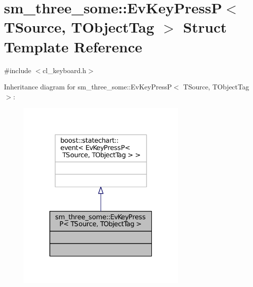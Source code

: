 \hypertarget{structsm__three__some_1_1EvKeyPressP}{}\section{sm\+\_\+three\+\_\+some\+:\+:Ev\+Key\+PressP$<$ T\+Source, T\+Object\+Tag $>$ Struct Template Reference}
\label{structsm__three__some_1_1EvKeyPressP}


{\ttfamily \#include $<$cl\+\_\+keyboard.\+h$>$}



Inheritance diagram for sm\+\_\+three\+\_\+some\+:\+:Ev\+Key\+PressP$<$ T\+Source, T\+Object\+Tag $>$\+:
\nopagebreak
\begin{figure}[H]
\begin{center}
\leavevmode
\includegraphics[width=235pt]{structsm__three__some_1_1EvKeyPressP__inherit__graph}
\end{center}
\end{figure}



